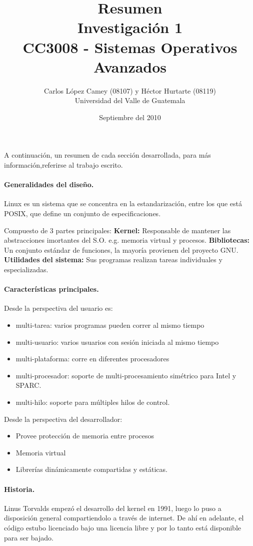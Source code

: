\documentclass[spanish]{article}
\title{
Resumen \\
Investigación 1\\
CC3008 - Sistemas Operativos Avanzados}
\author{Carlos López Camey (08107) y Héctor Hurtarte (08119)\\
Universidad del Valle de Guatemala}
\date{Septiembre del 2010}
\begin{document}
A continuación, un resumen de cada sección desarrollada, para más información,referirse al trabajo escrito.

\paragraph{Generalidades del diseño. } Linux es un sistema que se concentra en la estandarización, entre los que está POSIX, que define un conjunto de especificaciones. 

Compuesto de 3 partes principales:
\textbf{Kernel:} Responsable de mantener las abstracciones imortantes del S.O. e.g. memoria virtual y procesos.
\textbf{Bibliotecas:} Un conjunto estándar de funciones, la mayoría provienen del proyecto GNU.
\textbf{Utilidades del sistema:} Sus programas realizan tareas individuales y especializadas.

\paragraph{Características principales.}

Desde la perspectiva del usuario es: 
\begin{itemize}
  \item multi-tarea: varios programas pueden correr al mismo tiempo
  \item multi-usuario: varios usuarios con sesión iniciada al mismo tiempo
  \item multi-plataforma: corre en diferentes procesadores
  \item multi-procesador: soporte de multi-procesamiento simétrico para Intel y SPARC.
  \item multi-hilo: soporte para múltiples hilos de control.
\end{itemize}

Desde la perspectiva del desarrollador:
\begin{itemize}
  \item Provee protección de memoria entre procesos
  \item Memoria virtual 
  \item Librerías dinámicamente compartidas y estáticas.
\end{itemize}

\paragraph{Historia.} Linus Torvalds empezó el desarrollo del kernel en 1991, luego lo puso a disposición general compartiendolo a través de internet. De ahí en adelante, el código estubo licenciado bajo una licencia libre y por lo tanto está disponible para ser bajado.
\end{document}
